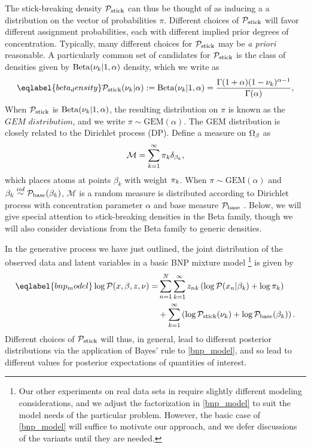 The stick-breaking density $\mathcal{P}_{\mathrm{stick}}$ can thus be thought of as inducing a a
distribution on the vector of probabilities $\pi$.  Different choices of
$\mathcal{P}_{\mathrm{stick}}$ will favor different assignment probabilities, each with different
implied prior degrees of concentration.
%
Typically, many different choices for $\mathcal{P}_{\mathrm{stick}}$ may be {\em a priori}
reasonable.  A particularly common set of candidates for $\mathcal{P}_{\mathrm{stick}}$ is the class
of densities given by $\mathrm{Beta}(\nu_{k} \vert 1, \alpha)$ density, which we
write as
%
\begin{align}\eqlabel{beta_density}
%
\pstick(\nuk \vert \alpha) :=
\mathrm{Beta}(\nuk \vert 1, \alpha) =
    \frac{\Gamma(1 + \alpha) (1 - \nuk)^{\alpha - 1}}
         {\Gamma(\alpha)},
%
\end{align}
%
When $\mathcal{P}_{\mathrm{stick}}$ is $\mathrm{Beta}(\nu_{k} \vert 1, \alpha)$, the resulting
distribution on $\pi$ is known as the $\textit{GEM distribution}$, and we write
$\pi \sim \mathrm{GEM}(\alpha)$.
%
The GEM distribution is closely related to the Dirichlet process (DP).
Define a measure on $\Omega_{\beta}$ as
%
\begin{align*}
  \mathcal{M} = \sum_{k = 1}^\infty \pi_k\delta_{\beta_k},
\end{align*}
%
which places atoms at points $\beta_k$ with weight $\pi_k$. When $\pi \sim
\mathrm{GEM}(\alpha)$ and $\beta_k \overset{iid}{\sim} \mathcal{P}_{\mathrm{base}}(\beta_k)$, $\mathcal{M}$
is a random measure is distributed according to Dirichlet process with
concentration parameter $\alpha$ and base measure $\mathcal{P}_{\mathrm{base}}$
\citep{ferguson:1973:bayesian, sethuraman:1994:constructivedp}. Below, we will
give special attention to stick-breaking densities in the Beta family, though we
will also consider deviations from the Beta family to generic densities.

In the generative process we have just outlined, the joint distribution of the
observed data and latent variables in a basic BNP mixture model
%
\footnote{ Our other experiments on real data sets in  require slightly different modeling considerations, and we
adjust the factorization in \eqref{bnp_model} to suit the model needs of the
particular problem.  However, the basic case of \eqref{bnp_model} will suffice
to motivate our approach, and we defer discussions of the variants until they
are needed.}
%
is given by
%
\begin{align}\eqlabel{bnp_model}
%
\logp(\x, \beta, \z, \nu) =&
\sum_{n=1}^N \sum_{k=1}^{\infty}
    \z_{\n\k} \left(
        \logp(\x_n \vert \beta_\k) + \log \pi_\k
    \right)
\nonumber\\
   & +
    \sum_{k=1}^{\infty} \left(
        \log \pstick(\nuk) + \log \pbetaprior(\beta_\k)
    \right).
%
\end{align}
%
Different choices of $\mathcal{P}_{\mathrm{stick}}$ will thus, in general, lead to different
posterior distributions via the application of Bayes' rule to \eqref{bnp_model},
and so lead to different values for posterior expectations of quantities of
interest.

